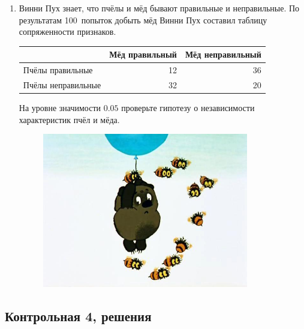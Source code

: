 \documentclass[12pt, a4paper]{article}\usepackage[]{graphicx}\usepackage[]{color}
\begin{document}
\begin{enumerate}
							\item Винни Пух знает, что пчёлы и мёд бывают правильные и неправильные. По результатам 100~попыток добыть мёд Винни Пух составил таблицу сопряженности признаков.


							\begin{tabular}{lrr}
								\toprule
								& Мёд правильный & Мёд неправильный \\
								\midrule
								Пчёлы правильные & 12	& 36 \\
								Пчёлы неправильные & 32	& 20 \\
								\bottomrule
							\end{tabular}


							На уровне значимости $0.05$ проверьте гипотезу о независимости характеристик пчёл и мёда.


							\begin{figure}[b]
								\centering
								\includegraphics[width=9cm]{images/winnie_kr_4}
							\end{figure}



						\end{enumerate}


						\subsection{Контрольная 4, решения}
\end{document}

